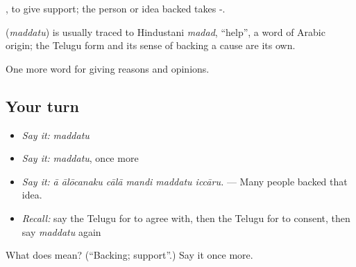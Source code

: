  , to give support; the person or idea backed takes -.

\begin{cousinweb}
\textbf{} (\emph{maddatu}) is usually traced to Hindustani \emph{madad}, \textquotedblleft{}help\textquotedblright{}, a word of Arabic origin; the Telugu form and its sense of backing a cause are its own.
\end{cousinweb}

\begin{grammarlens}[title={What you've built}]
One more word for giving reasons and opinions.
\end{grammarlens}

\subsection*{Your turn}
\begin{itemize}
\raggedright
  \item \emph{Say it:} \emph{maddatu}
  \item \emph{Say it:} \emph{maddatu}, once more
  \item \emph{Say it:} \emph{ā ālōcanaku cālā mandi maddatu iccāru.} — Many people backed that idea.
  \item \emph{Recall:} say the Telugu for to agree with, then the Telugu for to consent, then say \emph{maddatu} again
\end{itemize}

\begin{tcolorbox}[breakable,colback=teal!4,colframe=teal!35!black,title={Before you move on}]
What does  mean? (\textquotedblleft{}Backing; support\textquotedblright{}.) Say it once more.
\end{tcolorbox}
